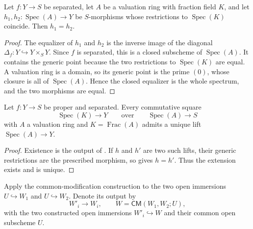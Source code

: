 \begin{lemma}
  \label{lemma:nagata-separated-valuation-lift-unique}
  \leanok

  Let $f\colon Y\to S$ be separated, let $A$ be a valuation ring with
  fraction field $K$, and let $h_1,h_2\colon\operatorname{Spec}(A)\to Y$ be
  $S$-morphisms whose restrictions to $\operatorname{Spec}(K)$ coincide.
  Then $h_1=h_2$.
\end{lemma}

\begin{proof}
  \leanok
  The equalizer of $h_1$ and $h_2$ is the inverse image of the diagonal
  $\Delta_f\colon Y\hookrightarrow Y\times_S Y$.  Since $f$ is separated,
  this is a closed subscheme of $\operatorname{Spec}(A)$.  It contains the
  generic point because the two restrictions to $\operatorname{Spec}(K)$ are
  equal.  A valuation ring is a domain, so its generic point is the prime
  $(0)$, whose closure is all of $\operatorname{Spec}(A)$.  Hence the closed
  equalizer is the whole spectrum, and the two morphisms are equal.
\end{proof}

\begin{lemma}
  \label{lemma:nagata-proper-separated-valuation-extension}
  \leanok

  Let $f\colon Y\to S$ be proper and separated.  Every commutative square
  \[
    \operatorname{Spec}(K)\longrightarrow Y
    \qquad\text{over}\qquad
    \operatorname{Spec}(A)\longrightarrow S
  \]
  with $A$ a valuation ring and $K=\operatorname{Frac}(A)$ admits a unique
  lift $\operatorname{Spec}(A)\to Y$.
\end{lemma}

\begin{proof}
  \leanok
  Existence is the output of
  .  If $h$ and
  $h'$ are two such lifts, their generic restrictions are the prescribed
  morphism, so
   gives $h=h'$.  Thus the
  extension exists and is unique.
\end{proof}

\begin{definition}
  \label{def:nagata-two-open-final-modification}
  \leanok

  Apply the common-modification construction to the two open immersions
  $U\hookrightarrow W_1$ and $U\hookrightarrow W_2$.  Denote its output by
  \[
    W'_i\longrightarrow W_i,
    \qquad
    W=\mathsf{CM}(W_1,W_2;U),
  \]
  with the two constructed open immersions $W'_i\hookrightarrow W$ and their
  common open subscheme $U$.
\end{definition}

